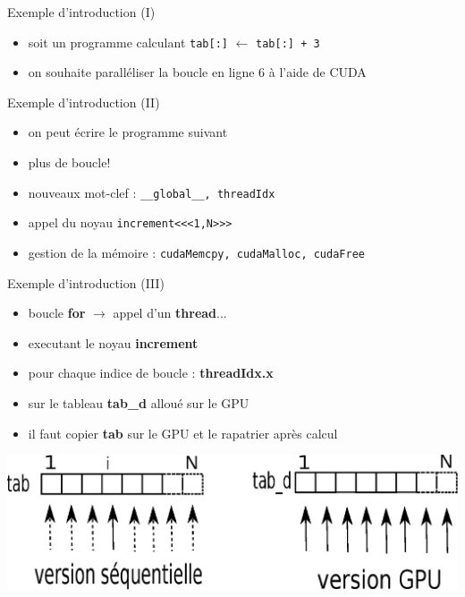 \documentclass[11pt,mathserif]{beamer}
\begin{document}
\begin{frame}{Exemple d'introduction (I)}
\pause
\begin{itemize}[<+->]
 \item soit un programme calculant \texttt{tab[:]} $\leftarrow$ \texttt{tab[:] + 3}

\item on souhaite paralléliser la boucle en ligne 6 à l'aide de CUDA
\end{itemize}
\end{frame}
\begin{frame}{Exemple d'introduction (II) }
\pause
\begin{itemize}[<+->]
 \item on peut écrire le programme suivant

\item plus de boucle!
\item nouveaux mot-clef : \texttt{\_\_global\_\_, threadIdx}
\item appel du noyau \texttt{increment<<<1,N>>>}
\item gestion de la mémoire : \texttt{cudaMemcpy, cudaMalloc, cudaFree}
\end{itemize}
\end{frame}
\begin{frame}{Exemple d'introduction (III)}
\pause
\begin{itemize}[<+->]
  \item boucle \textbf{for} $\rightarrow$ appel d'un {\bf thread}...
 \item executant le noyau \textbf{increment}
 \item pour chaque indice de boucle : \textbf{threadIdx.x }
 \item sur le tableau \textbf{tab\_d} alloué sur le GPU
 \item il faut copier \textbf{tab} sur le GPU et le rapatrier après calcul
\end{itemize}
\pause
\begin{center}
\includegraphics[width=0.9\linewidth]{fig/parallel.eps}
\end{center}
\end{frame}
\end{document}

